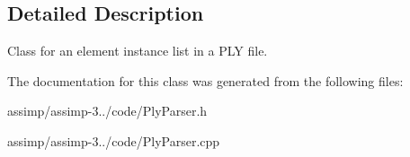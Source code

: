 \subsection{Detailed Description}
Class for an element instance list in a P\+L\+Y file. 

The documentation for this class was generated from the following files\+:\begin{DoxyCompactItemize}
\item 
assimp/assimp-\/3../code/Ply\+Parser.\+h\item 
assimp/assimp-\/3../code/Ply\+Parser.\+cpp\end{DoxyCompactItemize}
